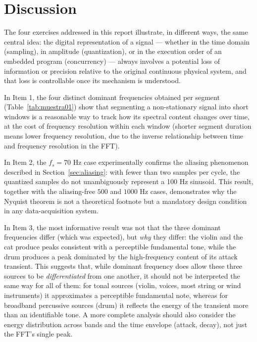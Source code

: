 
\section{Discussion}

The four exercises addressed in this report illustrate, in different ways, the same central idea: the digital representation of a signal — whether in the time domain (sampling), in amplitude (quantization), or in the execution order of an embedded program (concurrency) — always involves a potential loss of information or precision relative to the original continuous physical system, and that loss is controllable once its mechanism is understood.

In Item 1, the four distinct dominant frequencies obtained per segment (Table~\ref{tab:muestra01}) show that segmenting a non-stationary signal into short windows is a reasonable way to track how its spectral content changes over time, at the cost of frequency resolution within each window (shorter segment duration means lower frequency resolution, due to the inverse relationship between time and frequency resolution in the FFT).

In Item 2, the $f_s = 70$ Hz case experimentally confirms the aliasing phenomenon described in Section~\ref{sec:aliasing}: with fewer than two samples per cycle, the quantized samples do not unambiguously represent a 100 Hz sinusoid. This result, together with the aliasing-free $500$ and $1000$ Hz cases, demonstrates why the Nyquist theorem is not a theoretical footnote but a mandatory design condition in any data-acquisition system.

In Item 3, the most informative result was not that the three dominant frequencies differ (which was expected), but \emph{why} they differ: the violin and the cat produce peaks consistent with a perceptible fundamental tone, while the drum produces a peak dominated by the high-frequency content of its attack transient. This suggests that, while dominant frequency does allow these three sources to be \emph{differentiated} from one another, it should not be interpreted the same way for all of them: for tonal sources (violin, voices, most string or wind instruments) it approximates a perceptible fundamental note, whereas for broadband percussive sources (drum) it reflects the energy of the transient more than an identifiable tone. A more complete analysis should also consider the energy distribution across bands and the time envelope (attack, decay), not just the FFT's single peak.

